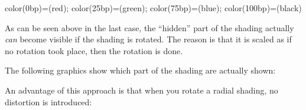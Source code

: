 \begin{command}{\pgfshadepath{}}
\begin{codeexample}[]
 {color(0bp)=(red); color(25bp)=(green);  color(75bp)=(blue);  color(100bp)=(black)}
\hskip 1cm
\begin{pgfpicture}
  \pgfpathrectangle{\pgfpointorigin}{\pgfpoint{2cm}{1cm}}
  \pgfpathrectangle{\pgfpoint{3cm}{0cm}}{\pgfpoint{1cm}{2cm}}
  \pgfpathrectangle{\pgfpoint{5cm}{0cm}}{\pgfpoint{2cm}{2cm}}
  \pgfpathcircle{\pgfpoint{9cm}{1cm}}{1cm}
\end{pgfpicture}
\end{codeexample}

  As can be seen above in the last case, the ``hidden'' part of the
  shading actually \emph{can} become visible if the shading is
  rotated. The reason is that it is scaled as if no rotation took
  place, then the rotation is done.

  The following graphics show which part of the shading are actually
  shown: 

\begin{codeexample}[]
\end{codeexample}
  
  An advantage of this approach is that when you rotate a radial
  shading, no distortion is introduced:


\end{command}
